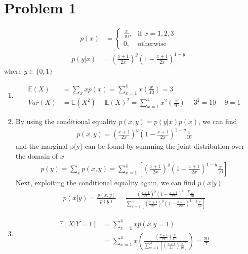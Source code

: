 \section{Problem 1}

	\begin{align*}
		p(x) & = \begin{cases}
			\frac{x}{10}, & \text{if } x = 1, 2, 3 \\
			0, & \text{otherwise}
		\end{cases}
	\end{align*}
	\begin{align*}
		p(y| x) & = \left( \frac{x + 1}{2x} \right)^{y} \left( 1 - \frac{x + 1}{2x} \right)^{1 - y}
	\end{align*}
	where $y \in \{ 0, 1 \}$
	
	\begin{enumerate}
		\item %
			\begin{align*}
				\mathbb{E}(X) & = \sum_{x} xp(x) = \sum_{x = 1}^{4} x\left( \frac{x}{10} \right) = \boxed{3} \\
				Var(X) & = \mathbb{E}(X^{2}) - \mathbb{E}(X)^{2} = \sum_{x = 1}^{4} x^{2} \left( \frac{x}{10} \right) - 3^{2} = 10 - 9 = \boxed{1}
			\end{align*}
		
		\item %
			By using the conditional equality $p(x, y) = p(y | x) p(x)$, we can find
			\begin{align*}
				p(x, y) = \left( \frac{x + 1}{2x} \right)^{y} \left( 1 - \frac{x + 1}{2x} \right)^{1 - y} \frac{x}{10}	
			\end{align*}
			and the marginal p(y) can be found by summing the joint distribution over the domain of $x$ 
			\begin{align*}
					p(y) = \sum_{x}p(x, y) = \sum_{x=1}^{4} \left[ \left( \frac{x + 1}{2x} \right)^{y} \left( 1 - \frac{x + 1}{2x} \right)^{1 - y} \frac{x}{10} \right]
			\end{align*}
			Next, exploiting the conditional equality again, we can find $p(x | y)$
			\begin{align*}
				 \boxed{p(x | y) = \frac{p(x, y)}{p(y)} = \frac{\left( \frac{x + 1}{2x} \right)^{y} \left( 1 - \frac{x + 1}{2x} \right)^{1 - y} \frac{x}{10}}{\sum_{x=1}^{4} \left[ \left( \frac{x + 1}{2x} \right)^{y} \left( 1 - \frac{x + 1}{2x} \right)^{1 - y} \frac{x}{10} \right]}}
			\end{align*}
	
		\item  %
			\begin{align*}
				\mathbb{E}[X | Y = 1] & = \sum_{x = 1}^{4} x p(x | y = 1) \\
				& = \sum_{x = 1}^{4} x \left( \frac{\left( \frac{x + 1}{2x} \right) \frac{x}{10}}{\sum_{x=1}^{4} \left[ \left( \frac{x + 1}{2x} \right) \frac{x}{10} \right]} \right) = \frac{20}{7}
			\end{align*}						
	\end{enumerate}